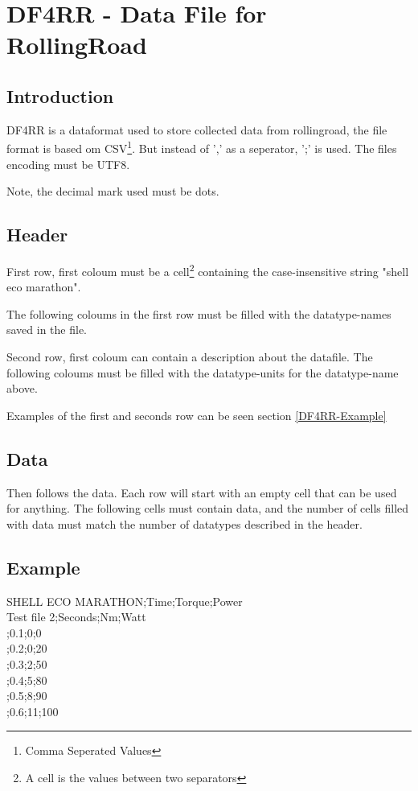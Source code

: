\section{DF4RR - Data File for RollingRoad}

\subsection{Introduction}

DF4RR is a dataformat used to store collected data from rollingroad, the file format is based om CSV\footnote{Comma Seperated Values}\cite{CSVFileDescription}. But instead of ',' as a seperator, ';' is used. The files encoding must be UTF8\cite{UTF8Description}.

Note, the decimal mark used must be dots.

\subsection{Header}

First row, first coloum must be a cell\footnote{A cell is the values between two separators} containing the case-insensitive string "shell eco marathon".

The following coloums in the first row must be filled with the datatype-names saved in the file.

Second row, first coloum can contain a description about the datafile. The following coloums must be filled with the datatype-units for the datatype-name above. 

Examples of the first and seconds row can be seen section \vref{DF4RR-Example}

\subsection{Data}

Then follows the data. Each row will start with an empty cell that can be used for anything. The following cells must contain data, and the number of cells filled with data must match the number of datatypes described in the header. 

\subsection{Example}
\label{DF4RR-Example}

SHELL ECO MARATHON;Time;Torque;Power\\
Test file 2;Seconds;Nm;Watt\\
;0.1;0;0\\
;0.2;0;20\\
;0.3;2;50\\
;0.4;5;80\\
;0.5;8;90\\
;0.6;11;100\\
